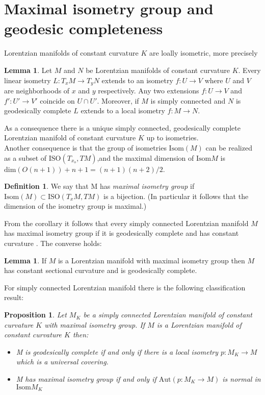 \documentclass[10pt,a4paper,oneside,reqno]{book}
\theoremstyle{plain}
\theoremstyle{definition}
\newtheorem{definition}[theorem]{Definition} %
\newtheorem{lemma}[theorem]{Lemma} %
\theoremstyle{plain}
\newtheorem{proposition}[theorem]{Proposition}
\theoremstyle{plain}
\theoremstyle{mystyleNormalFont}
\begin{document}
\section{Maximal isometry group and geodesic completeness}
Lorentzian manifolds of constant curvature $K$ are loally isometric, more precisely
\begin{lemma}
    Let $M$ and $N$ be Lorentzian manifolds of constant curvature $K$. Every linear isometry $L: T_x M \to T_y N$ extends to an isometry $f: U \to V$ where $U$ and $V$ are neighborhoods of $x$ and $y$ respectively. Any two extensions $f:U\to V$ and $f' : U' \to V'$ coincide on $U \cap U'$. Moreover, if $M$ is simply connected and $N$ is geodesically complete $L$ extends to a local isometry $f:M\to N$.
\end{lemma}
As a consequence there is a unique simply connected, geodesically complete Lorentzian manifold of constant curvature $K$ up to isometries.\\
Another consequence is that the group of isometries $\text{Isom}(M)$ can be realized as a subset of $\text{ISO}(T_{x_o}, TM)$,and the maximal dimension of $\text{Isom}M$ is $\text{dim}(O(n+1)) + n +1 = (n+1)(n+2)/2$.\\
\begin{definition}
    We say that M has \textit{maximal isometry group} if $\text{Isom}(M) \subset \text{ISO}(T_xM, TM)$ is a bijection. (In particular it follows that the dimension of the isometry group is maximal.)
\end{definition}
From the corollary it follows that every simply connected Lorentzian manifold $M$ has maximal isometry group if it is geodesically complete and has constant curvature . The converse holds:
\begin{lemma}
    If $M$ is a Lorentzian manifold with maximal isometry group then $M$ has constant sectional curvature and is geodesically complete.
\end{lemma}
For simply connected Lorentzian manifold there is the following classification result:
\begin{proposition}
    Let $M_K$ be a simply connected Lorentzian manifold of constant curvature $K$ with maximal isometry group. If $M$ is a Lorentzian manifold of constant curvature $K$ then:
    \begin{itemize}
        \item M is geodesically complete if and only if there is a local isometry $p:M_K \to M$ which is a universal covering.
        \item M has maximal isometry group if and only if $\text{Aut}(p:M_K \to M)$ is normal in $\text{Isom}M_K$
    \end{itemize}
\end{proposition} 
\end{document}
